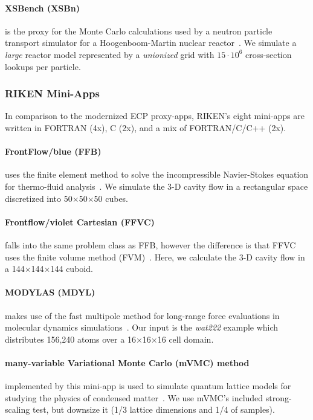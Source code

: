 \paragraph{XSBench (XSBn)} is the proxy for the Monte Carlo calculations used by a neutron particle transport
simulator for a Hoogenboom-Martin nuclear reactor~\cite{tramm_xsbench_2014}. We simulate a \textit{large} reactor model
represented by a \textit{unionized} grid with $15\cdot10^6$ cross-section lookups per particle.


\subsubsection{RIKEN Mini-Apps}\label{ssec:postk}
In comparison to the modernized ECP proxy-apps, RIKEN's eight mini-apps are written in
FORTRAN (4x), C (2x), and a mix of FORTRAN/C/C++ (2x).

\paragraph{FrontFlow/blue (FFB)} uses the finite element method to solve the incompressible Navier-Stokes
equation for thermo-fluid analysis~\cite{guo_basic_2006}.
We simulate the 3-D cavity flow in a rectangular space discretized into 50$\times$50$\times$50 cubes.

\paragraph{Frontflow/violet Cartesian (FFVC)} falls into the same problem class as
FFB, however the difference is that FFVC uses the finite volume method (FVM)~\cite{ono_ffv-c_nodate}.
Here, we calculate the 3-D cavity flow in a 144$\times$144$\times$144 cuboid.

\paragraph{MODYLAS (MDYL)} makes use of the fast multipole method for long-range force evaluations in
molecular dynamics simulations~\cite{andoh_modylas:_2013}.
Our input is the \textit{wat222} example which distributes 156,240 atoms over a
16$\times$16$\times$16 cell domain.

\paragraph{many-variable Variational Monte Carlo (mVMC) method} implemented by this mini-app is used
to simulate quantum lattice models for studying the physics of condensed matter~\cite{misawa_mvmc--open-source_2018}.
We use mVMC's included strong-scaling test, but downsize it (1/3 lattice dimensions and 1/4 of samples). 

